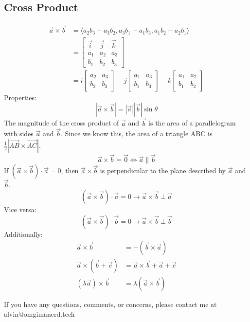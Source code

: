 \documentclass[letterpaper, 12pt]{math}
\begin{document}
\subsection*{Cross Product}
\begin{align*}
  \vec{a}\times\vec{b} &= \langle a_{2}b_{3}-a_{3}b_{2},a_{3}b_{1}-a_{1}b_{3},
  a_{1}b_{2}-a_{2}b_{1}\rangle \\
  &= \begin{bmatrix}
    \vec{i} & \vec{j} & \vec{k} \\
    a_{1} & a_{2} & a_{3} \\
    b_{1} & b_{2} & b_{3}
  \end{bmatrix} \\
  &= i\begin{bmatrix}
    a_{2} & a_{3} \\
    b_{2} & b_{3}
  \end{bmatrix}-j\begin{bmatrix}
    a_{1} & a_{3} \\
    b_{1} & b_{3}
  \end{bmatrix}-k\begin{bmatrix}
    a_{1} & a_{2} \\
    b_{1} & b_{2}
  \end{bmatrix}
\end{align*}
Properties:
\[ |\vec{a}\times\vec{b}| = |\vec{a}||\vec{b}|\sin\theta \]
The magnitude of the cross product of \( \vec{a} \) and \( \vec{b} \) is the
area of a parallelogram with sides \( \vec{a} \) and \( \vec{b} \). Since we
know this, the area of a triangle ABC is
\( \frac{1}{2}|\vec{AB}\times\vec{AC}| \).
\[ \vec{a}\times\vec{b} = \vec{0} \iff \vec{a}\parallel\vec{b} \]
If \( (\vec{a}\times\vec{b})\cdot\vec{a} = 0 \), then \( \vec{a}\times\vec{b} \)
is perpendicular to the plane described by \( \vec{a} \) and \( \vec{b} \).
\[ (\vec{a}\times\vec{b})\cdot\vec{a} =
  0 \to \vec{a}\times\vec{b}\ \bot\ \vec{a} \]
Vice versa:
\[ (\vec{a}\times\vec{b})\cdot\vec{b} =
  0 \to \vec{a}\times\vec{b}\ \bot\ \vec{b} \]
Additionally:
\begin{align*}
  \vec{a}\times\vec{b} &= -(\vec{b}\times\vec{a}) \\
  \vec{a}\times(\vec{b}+\vec{c}) &= \vec{a}\times\vec{b}+\vec{a}+\vec{c} \\
  (\lambda\vec{a})\times\vec{b} &= \lambda(\vec{a}\times\vec{b})
\end{align*}

\begin{center}
  If you have any questions, comments, or concerns, please contact me at
  alvin@omgimanerd.tech
\end{center}
\end{document}
